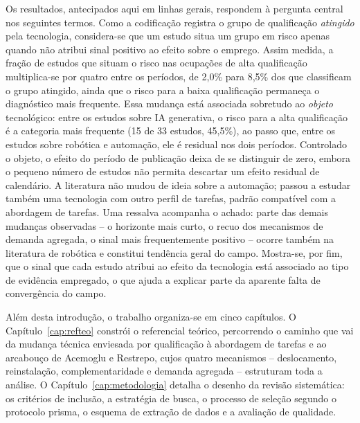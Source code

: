 Os resultados, antecipados aqui em linhas gerais, respondem à pergunta central nos seguintes termos. Como a codificação registra o grupo de qualificação \emph{atingido} pela tecnologia, considera-se que um estudo situa um grupo em risco apenas quando não atribui sinal positivo ao efeito sobre o emprego. Assim medida, a fração de estudos que situam o risco nas ocupações de alta qualificação multiplica-se por quatro entre os períodos, de 2,0\% para 8,5\% dos que classificam o grupo atingido, ainda que o risco para a baixa qualificação permaneça o diagnóstico mais frequente. Essa mudança está associada sobretudo ao \emph{objeto} tecnológico: entre os estudos sobre IA generativa, o risco para a alta qualificação é a categoria mais frequente (15 de 33 estudos, 45,5\%), ao passo que, entre os estudos sobre robótica e automação, ele é residual nos dois períodos. Controlado o objeto, o efeito do período de publicação deixa de se distinguir de zero, embora o pequeno número de estudos não permita descartar um efeito residual de calendário. A literatura não mudou de ideia sobre a automação; passou a estudar também uma tecnologia com outro perfil de tarefas, padrão compatível com a abordagem de tarefas. Uma ressalva acompanha o achado: parte das demais mudanças observadas -- o horizonte mais curto, o recuo dos mecanismos de demanda agregada, o sinal mais frequentemente positivo -- ocorre também na literatura de robótica e constitui tendência geral do campo. Mostra-se, por fim, que o sinal que cada estudo atribui ao efeito da tecnologia está associado ao tipo de evidência empregado, o que ajuda a explicar parte da aparente falta de convergência do campo.



Além desta introdução, o trabalho organiza-se em cinco capítulos. O  Capítulo~\ref{cap:refteo} constrói o referencial teórico, percorrendo o caminho que vai da mudança técnica enviesada por qualificação à abordagem de tarefas e ao arcabouço de Acemoglu e Restrepo, cujos quatro mecanismos -- deslocamento, reinstalação, complementaridade e demanda agregada -- estruturam toda a análise.  O Capítulo~\ref{cap:metodologia} detalha o desenho da revisão sistemática: os critérios de inclusão, a estratégia de busca, o processo de seleção segundo o protocolo \gls{prisma}, o esquema de extração de dados e a avaliação de qualidade.

